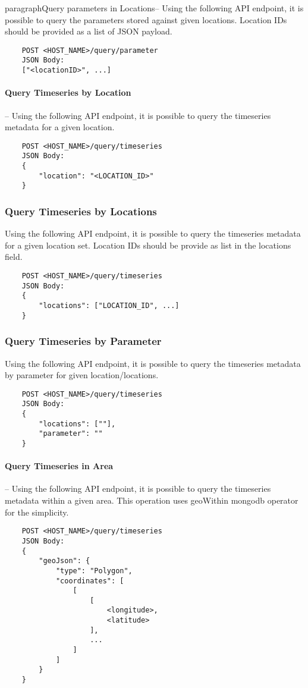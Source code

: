 paragraph{Query parameters in Locations}-- Using the following API endpoint, it is possible to query the parameters stored against given locations. Location IDs should be provided as a list of JSON payload.
\begin{lstlisting}
    POST <HOST_NAME>/query/parameter
    JSON Body:
    ["<locationID>", ...]
\end{lstlisting}

\paragraph{Query Timeseries by Location}-- Using the following API endpoint, it is possible to query the timeseries metadata for a given location.
\begin{lstlisting}
    POST <HOST_NAME>/query/timeseries
    JSON Body:
    {
        "location": "<LOCATION_ID>"
    }
\end{lstlisting}

\subsubsection{Query Timeseries by Locations}
Using the following API endpoint, it is possible to query the timeseries metadata for a given location set. Location IDs should be provide as list in the locations field.
\begin{lstlisting}
    POST <HOST_NAME>/query/timeseries
    JSON Body:
    {
        "locations": ["LOCATION_ID", ...]
    }
\end{lstlisting}

\subsubsection{Query Timeseries by Parameter}
Using the following API endpoint, it is possible to query the timeseries metadata by parameter for given location/locations.
\begin{lstlisting}
    POST <HOST_NAME>/query/timeseries
    JSON Body:
    {
        "locations": [""],
        "parameter": ""
    }
\end{lstlisting}

\paragraph{Query Timeseries in Area} -- Using the following API endpoint, it is possible to query the timeseries metadata within a given area. This operation uses geoWithin \acrshort{mongodb} operator for the simplicity.
\begin{lstlisting}
    POST <HOST_NAME>/query/timeseries
    JSON Body:
    {
        "geoJson": {
            "type": "Polygon",
            "coordinates": [
                [
                    [
                        <longitude>,
                        <latitude>
                    ],
                    ...
                ]
            ]
        }
    }
\end{lstlisting}

